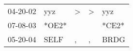 \begin{supertabular}{lllll}
 04-20-02 &    yyz &  \textgreater &  \textgreater &    yyz \\
 07-08-03 &  *OE2* &               &               &  *CE2* \\
 05-20-04 &   SELF &             , &             , &   BRDG \\
\end{supertabular}
